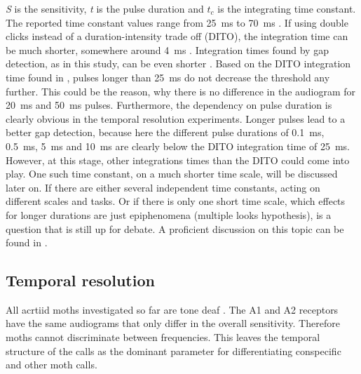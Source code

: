 \documentclass[12pt,a4paper,pdftex]{article}
\begin{document}
\textit{S} is the sensitivity, \textit{t} is the pulse duration and \textit{$t_c$} is the integrating time constant. The reported time constant values range from 25~ms \cite{surlykke1988} to 70~ms \cite{waters1996}. If using double clicks instead of a duration-intensity trade off (DITO), the integration time can be much shorter, somewhere around 4~ms \cite{tougaard1998}. Integration times found by gap detection, as in this study, can be even shorter \cite{surlykke1988}.
Based on the DITO integration time found in  \cite{surlykke1988}, pulses longer than 25~ms do not decrease the threshold any further. This could be the reason, why there is no difference in the audiogram for 20~ms and 50~ms pulses. Furthermore, the dependency on pulse duration is clearly obvious in the temporal resolution experiments. Longer pulses lead to a better gap detection, because here the different pulse durations of 0.1~ms, 0.5~ms, 5~ms and 10~ms are clearly below the DITO integration time of 25~ms. However, at this stage, other integrations times than the DITO could come into play. One such time constant, on a much shorter time scale, will be discussed later on. If there are either several independent time constants, acting on different scales and tasks. Or if there is only one short time scale, which effects for longer durations are just epiphenomena (multiple looks hypothesis), is a question that is still up for debate. A proficient discussion on this topic can be found in \cite{viemeister1991}. 

\subsection*{Temporal resolution}
All acrtiid moths investigated so far are tone deaf \cite{waters2003}. The A1 and A2 receptors have the same audiograms that only differ in the overall sensitivity. Therefore moths cannot discriminate between frequencies. This leaves the temporal structure of the calls as the dominant parameter for differentiating conspecific and other moth calls. 
\end{document}
